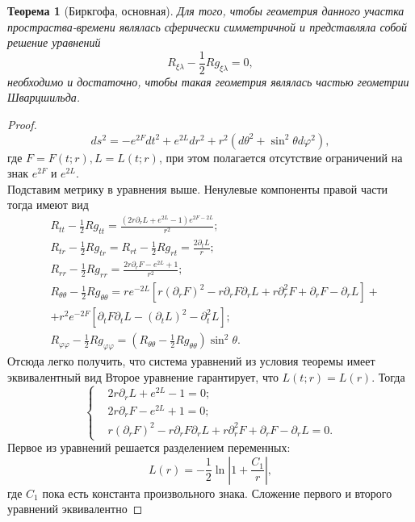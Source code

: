 \documentclass[a4paper, 14pt]{scrarticle}
\theoremstyle{Imperial}
\newtheorem{theorem}{Теорема}
\begin{document}
	\begin{theorem}[Биркгофа, основная]
		Для того, чтобы геометрия данного участка простраства-времени являлась сферически симметричной и представляла собой решение уравнений
		$$R_{\xi\lambda} - \frac{1}{2} R g_{\xi\lambda}= 0,$$
		необходимо и достаточно, чтобы такая геометрия являлась частью геометрии Шварцшильда.	
	\end{theorem}
	\begin{proof}
		$$ds^2 = - e^{2F} dt^2 + e^{2L} dr^2 + r^2 \left( d\theta^2 + \sin^2 \theta d\varphi^2 \right),$$
		где $F = F(t;r), L = L(t;r)$, при этом полагается отсутствие ограничений на знак $e^{2F}$ и $e^{2L}$.\\
		Подставим метрику в уравнения выше. Ненулевые компоненты правой части тогда имеют вид
		$$\begin{aligned}
			&R_{tt} - \frac{1}{2} R g_{tt} = \frac{\left(2 r \partial_r L + e^{2 L} - 1 \right) e^{2 F- 2 L}}{r^2};\\
			&R_{tr} - \frac{1}{2} R g_{tr} = R_{rt} - \frac{1}{2} R g_{rt} = \frac{2 \partial_t L}{r};\\
			&R_{rr} - \frac{1}{2} R g_{rr} = \frac{2 r \partial_r F- e^{2 L} + 1}{r^2};\\
			&R_{\theta\theta} -\frac{1}{2} R g_{\theta\theta} = re^{-2L}\left[r\left(\partial_{r}F\right)^{2}-r\partial_{r}F\partial_{r}L+r\partial_{r}^{2}F+\partial_{r}F-\partial_{r}L\right]+\\
			&+r^{2}e^{-2F}\left[\partial_{t}F\partial_{t}L-\left(\partial_{t}L\right)^{2}-\partial_{t}^{2}L\right];\\
			&R_{\varphi\varphi} - \frac{1}{2} R g_{\varphi\varphi} = \left( R_{\theta\theta} - \frac{1}{2} R g_{\theta\theta} \right) \sin^2 \theta.
		\end{aligned}$$
		Отсюда легко получить, что система уравнений из условия теоремы имеет эквивалентный вид
		Второе уравнение гарантирует, что $L(t;r) = L(r)$. Тогда 
		$$\left\lbrace\begin{aligned}
			&2r\partial_r L + e^{2L} - 1 = 0;\\
			&2r\partial_r F- e^{2L} + 1 = 0;\\
			&r\left(\partial_{r}F\right)^{2}-r\partial_{r}F\partial_{r}L+r\partial_{r}^{2}F+\partial_{r}F-\partial_{r}L = 0.
		\end{aligned}\right.$$
		Первое из уравнений решается разделением переменных:
		$$L(r) = - \frac{1}{2} \ln | 1 + \frac{C_1}{r} |,$$ 
		где $C_1$ пока есть константа произвольного знака. Сложение первого и второго уравнений эквивалентно 

\end{proof}
\end{document}
